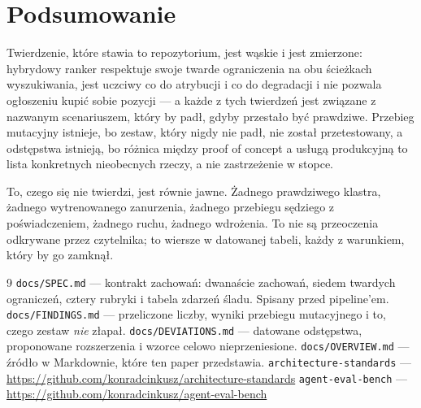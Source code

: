 \documentclass[11pt,a4paper]{article}
\begin{document}
\section{Podsumowanie}

Twierdzenie, które stawia to repozytorium, jest wąskie i jest zmierzone:
hybrydowy ranker respektuje swoje twarde ograniczenia na obu ścieżkach
wyszukiwania, jest uczciwy co do atrybucji i co do degradacji i nie pozwala
ogłoszeniu kupić sobie pozycji --- a każde z tych twierdzeń jest związane z
nazwanym scenariuszem, który by padł, gdyby przestało być prawdziwe. Przebieg
mutacyjny istnieje, bo zestaw, który nigdy nie padł, nie został przetestowany,
a odstępstwa istnieją, bo różnica między proof of concept a usługą produkcyjną
to lista konkretnych nieobecnych rzeczy, a nie zastrzeżenie w stopce.

To, czego się nie twierdzi, jest równie jawne. Żadnego prawdziwego klastra,
żadnego wytrenowanego zanurzenia, żadnego przebiegu sędziego z poświadczeniem,
żadnego ruchu, żadnego wdrożenia. To nie są przeoczenia odkrywane przez
czytelnika; to wiersze w datowanej tabeli, każdy z warunkiem, który by go
zamknął.

\begin{thebibliography}{9}
 \texttt{docs/SPEC.md} --- kontrakt zachowań: dwanaście
zachowań, siedem twardych ograniczeń, cztery rubryki i tabela zdarzeń śladu.
Spisany przed pipeline'em.
 \texttt{docs/FINDINGS.md} --- przeliczone liczby, wyniki
przebiegu mutacyjnego i to, czego zestaw \emph{nie} złapał.
 \texttt{docs/DEVIATIONS.md} --- datowane odstępstwa,
proponowane rozszerzenia i wzorce celowo nieprzeniesione.
 \texttt{docs/OVERVIEW.md} --- źródło w Markdownie, które
ten paper przedstawia.
 \texttt{architecture-standards} ---
\url{https://github.com/konradcinkusz/architecture-standards}
 \texttt{agent-eval-bench} ---
\url{https://github.com/konradcinkusz/agent-eval-bench}
\end{thebibliography}
\end{document}
